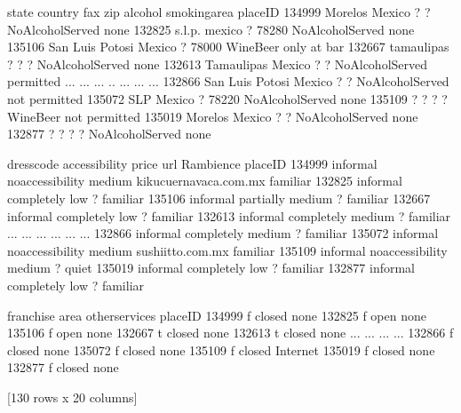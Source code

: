 \documentclass[letterpaper,10pt,english]{jupyterBook}
\begin{document}
\begin{sphinxVerbatim}[commandchars=\\\{\}]
                   state country fax    zip            alcohol   smoking\PYGZus{}area  \PYGZbs{}
placeID                                                                         
134999           Morelos  Mexico   ?      ?  No\PYGZus{}Alcohol\PYGZus{}Served           none   
132825            s.l.p.  mexico   ?  78280  No\PYGZus{}Alcohol\PYGZus{}Served           none   
135106   San Luis Potosi  Mexico   ?  78000          Wine\PYGZhy{}Beer    only at bar   
132667        tamaulipas       ?   ?      ?  No\PYGZus{}Alcohol\PYGZus{}Served           none   
132613        Tamaulipas  Mexico   ?      ?  No\PYGZus{}Alcohol\PYGZus{}Served      permitted   
...                  ...     ...  ..    ...                ...            ...   
132866   San Luis Potosi  Mexico   ?      ?  No\PYGZus{}Alcohol\PYGZus{}Served  not permitted   
135072               SLP  Mexico   ?  78220  No\PYGZus{}Alcohol\PYGZus{}Served           none   
135109                 ?       ?   ?      ?          Wine\PYGZhy{}Beer  not permitted   
135019           Morelos  Mexico   ?      ?  No\PYGZus{}Alcohol\PYGZus{}Served           none   
132877                 ?       ?   ?      ?  No\PYGZus{}Alcohol\PYGZus{}Served           none   

        dress\PYGZus{}code     accessibility   price                    url Rambience  \PYGZbs{}
placeID                                                                         
134999    informal  no\PYGZus{}accessibility  medium  kikucuernavaca.com.mx  familiar   
132825    informal        completely     low                      ?  familiar   
135106    informal         partially  medium                      ?  familiar   
132667    informal        completely     low                      ?  familiar   
132613    informal        completely  medium                      ?  familiar   
...            ...               ...     ...                    ...       ...   
132866    informal        completely  medium                      ?  familiar   
135072    informal  no\PYGZus{}accessibility  medium      sushi\PYGZhy{}itto.com.mx  familiar   
135109    informal  no\PYGZus{}accessibility  medium                      ?     quiet   
135019    informal        completely     low                      ?  familiar   
132877    informal        completely     low                      ?  familiar   

        franchise    area other\PYGZus{}services  
placeID                                   
134999          f  closed           none  
132825          f    open           none  
135106          f    open           none  
132667          t  closed           none  
132613          t  closed           none  
...           ...     ...            ...  
132866          f  closed           none  
135072          f  closed           none  
135109          f  closed       Internet  
135019          f  closed           none  
132877          f  closed           none  

[130 rows x 20 columns]
\end{sphinxVerbatim}
\end{document}
